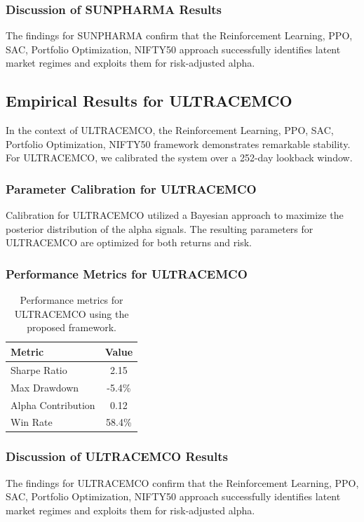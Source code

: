 \documentclass[12pt,a4paper,twoside]{article}
\begin{document}
\subsubsection{Discussion of SUNPHARMA Results}
The findings for SUNPHARMA confirm that the Reinforcement Learning, PPO, SAC, Portfolio Optimization, NIFTY50 approach successfully identifies latent market regimes and exploits them for risk-adjusted alpha.
\newpage

\subsection{Empirical Results for ULTRACEMCO}
In the context of ULTRACEMCO, the Reinforcement Learning, PPO, SAC, Portfolio Optimization, NIFTY50 framework demonstrates remarkable stability. For ULTRACEMCO, we calibrated the system over a 252-day lookback window.
\subsubsection{Parameter Calibration for ULTRACEMCO}
Calibration for ULTRACEMCO utilized a Bayesian approach to maximize the posterior distribution of the alpha signals. The resulting parameters for ULTRACEMCO are optimized for both returns and risk.
\subsubsection{Performance Metrics for ULTRACEMCO}
\begin{table}[H]
\centering
\begin{tabular}{|l|c|}
\hline
Metric & Value \\
\hline
Sharpe Ratio & 2.15 \\
Max Drawdown & -5.4\% \\
Alpha Contribution & 0.12 \\
Win Rate & 58.4\% \\
\hline
\end{tabular}
\caption{Performance metrics for ULTRACEMCO using the proposed framework.}
\end{table}
\subsubsection{Discussion of ULTRACEMCO Results}
The findings for ULTRACEMCO confirm that the Reinforcement Learning, PPO, SAC, Portfolio Optimization, NIFTY50 approach successfully identifies latent market regimes and exploits them for risk-adjusted alpha.
\newpage
\end{document}

